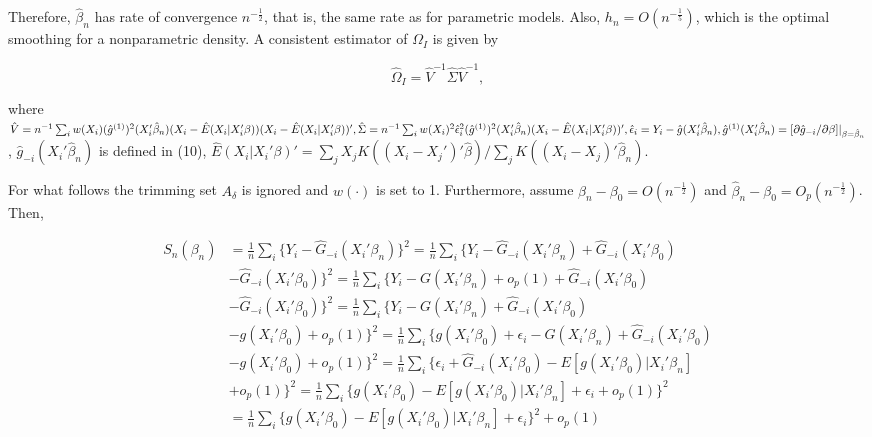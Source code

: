 \documentclass[a4paper]{article}
\newcommand{\norm}[1]{\left\lVert#1\right\rVert}
\begin{document}
Therefore, $\hat{\beta}_n$ has rate of convergence $n^{-\frac{1}{2}}$, that is, the same rate as for parametric models. Also, $h_n = O(n^{-\frac{1}{5}})$, which is the optimal smoothing for a  nonparametric density.
A consistent estimator of $\Omega_I$ is given by

\[ \hat{\Omega}_I = \hat{V}^{-1}\hat{\Sigma}\hat{V}^{-1}, \]

where $\hat{V} = n^{-1}\sum_{i} w(X_i)(\hat{g}^{(1)})^2(X_i'\hat{\beta}_n)(X_i - \hat{E}(X_i|X_i'\beta))(X_i - \hat{E}(X_i|X_i'\beta))', \hat{\Sigma} = n^{-1}\sum_{i} w(X_i)^2\hat{\epsilon}_{i}^{2}(\hat{g}^{(1)})^2(X_i'\hat{\beta}_n)(X_i - \hat{E}(X_i|X_i'\beta))', \hat{\epsilon}_i = Y_i - \hat{g}(X_i'\hat{\beta}_n), \hat{g}^{(1)}(X_i'\hat{\beta}_n) \linebreak
= [\partial \hat{g}_{-i}/\partial \beta]|_{\beta=\hat{\beta}_n}$, $\hat{g}_{-i}(X_i'\hat{\beta}_n)$ is defined in (10), $\hat{E}(X_i|X_i'\beta)' = \sum_{j} X_jK((X_i - X_j')'\hat{\beta})/ \sum_{j}K((X_i - X_j)'\hat{\beta}_n).$

For what follows the trimming set $A_\delta$ is ignored and $w(\cdot)$ is set to 1. Furthermore, assume $\beta_n - \beta_0 = O(n^{-\frac{1}{2}})$ and $\hat{\beta}_n - \beta_0 = O_p(n^{-\frac{1}{2}})$. Then, 



\begin{align*}
S_{n}(\beta_n) & = \frac{1}{n}\sum_i \{ Y_i - \hat{G}_{-i}(X_i'\beta_n)\}^2 = \frac{1}{n}\sum_i\{Y_i - \hat{G}_{-i}(X_i'\beta_n) +  \hat{G}_{-i}(X_i'\beta_0) \\
			 & - \hat{G}_{-i}(X_i'\beta_0) \}^2 = \frac{1}{n} \sum_i \{Y_i - G(X_i'\beta_n) + o_p(1) + \hat{G}_{-i}(X_i'\beta_0) \\
			 & - \hat{G}_{-i}(X_i'\beta_0) \}^2 = \frac{1}{n}\sum_i \{ Y_i - G(X_i'\beta_n) + \hat{G}_{-i}(X_i'\beta_0) \\
			 & - g(X_i'\beta_0) + o_p(1) \}^2 = \frac{1}{n} \sum_i \{ g(X_i'\beta_0) + \epsilon_i - G(X_i'\beta_n) + \hat{G}_{-i}(X_i'\beta_0) \\
			 & - g(X_i'\beta_0) + o_p(1) \}^2 = \frac{1}{n} \sum_i \{ \epsilon_i + \hat{G}_{-i}(X_i'\beta_0) - E[g(X_i'\beta_0)|X_i'\beta_n] \\
			 & + o_p(1) \}^2 = \frac{1}{n}\sum_i \{ g(X_i'\beta_0) - E[g(X_i'\beta_0)|X_i'\beta_n] +  \epsilon_i + o_p(1)\}^2 \\
			 & = \frac{1}{n}\sum_i \{ g(X_i'\beta_0) - E[g(X_i'\beta_0)|X_i'\beta_n] +  \epsilon_i\}^2 + o_p(1)
\end{align*}
\end{document}
